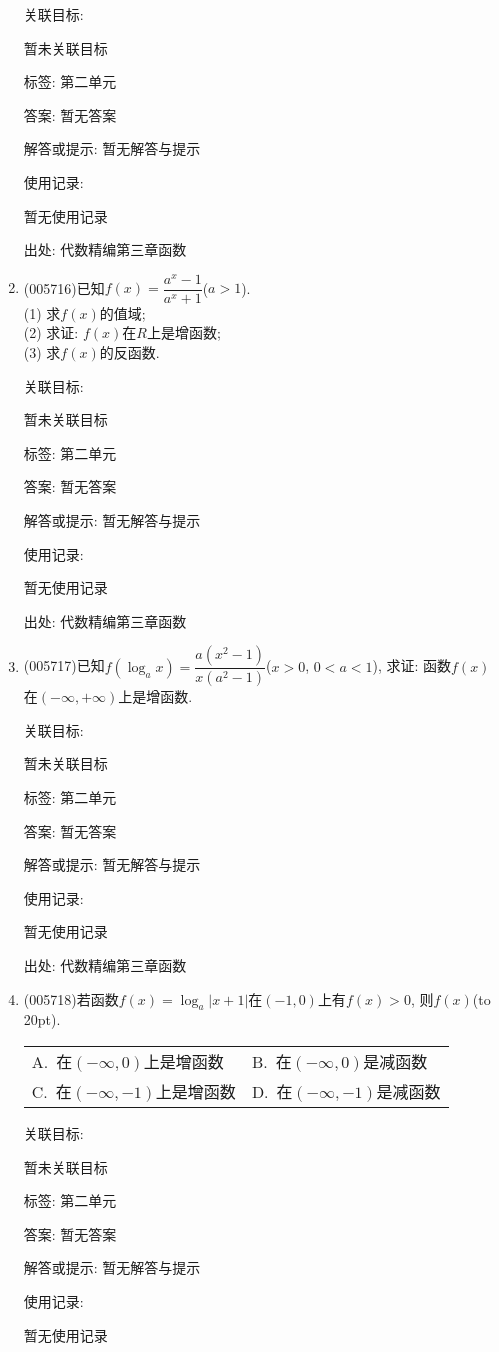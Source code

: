 \documentclass[10pt,a4paper]{article}
\newcommand{\bracket}[1]{(\hbox to #1pt{})}
\newcommand{\twoch}[4]{\par\begin{tabular}{p{.46\textwidth}p{.46\textwidth}}
A.~#1& B.~#2\\
C.~#3& D.~#4
\end{tabular}}
\begin{document}
\begin{enumerate}[1.]
关联目标:

暂未关联目标



标签: 第二单元

答案: 暂无答案

解答或提示: 暂无解答与提示

使用记录:

暂无使用记录


出处: 代数精编第三章函数
\item { (005716)}已知$f(x)=\dfrac{a^x-1}{a^x+1}$($a>1$).\\
(1) 求$f(x)$的值域;\\
(2) 求证: $f(x)$在$R$上是增函数;\\
(3) 求$f(x)$的反函数.


关联目标:

暂未关联目标



标签: 第二单元

答案: 暂无答案

解答或提示: 暂无解答与提示

使用记录:

暂无使用记录


出处: 代数精编第三章函数
\item { (005717)}已知$f(\log_ax)=\dfrac{a(x^2-1)}{x(a^2-1)}$($x>0$, $0<a<1$), 求证: 函数$f(x)$在$(-\infty ,+\infty)$上是增函数.


关联目标:

暂未关联目标



标签: 第二单元

答案: 暂无答案

解答或提示: 暂无解答与提示

使用记录:

暂无使用记录


出处: 代数精编第三章函数
\item { (005718)}若函数$f(x)=\log_a|x+1|$在$(-1, 0)$上有$f(x)>0$, 则$f(x)$\bracket{20}.
\twoch{在$(-\infty ,0)$上是增函数}{在$(-\infty ,0)$是减函数}{在$(-\infty ,-1)$上是增函数}{在$(-\infty ,-1)$是减函数}


关联目标:

暂未关联目标



标签: 第二单元

答案: 暂无答案

解答或提示: 暂无解答与提示

使用记录:

暂无使用记录



\end{enumerate}
\end{document}

